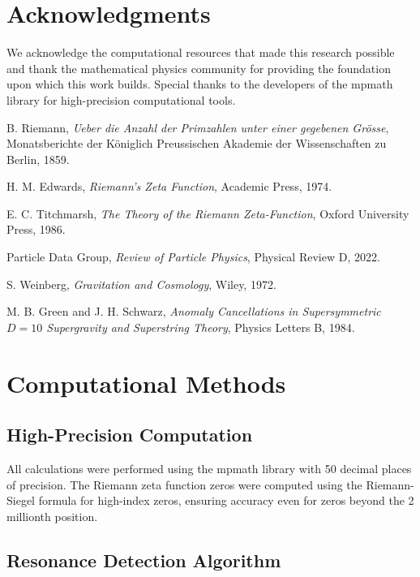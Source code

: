 \documentclass[12pt, a4paper]{article}
\begin{document}
\section{Acknowledgments}

We acknowledge the computational resources that made this research possible and thank the mathematical physics community for providing the foundation upon which this work builds. Special thanks to the developers of the mpmath library for high-precision computational tools.

\begin{thebibliography}{99}
B. Riemann, \emph{Ueber die Anzahl der Primzahlen unter einer gegebenen Gr{\"o}sse}, Monatsberichte der K{\"o}niglich Preussischen Akademie der Wissenschaften zu Berlin, 1859.

H. M. Edwards, \emph{Riemann's Zeta Function}, Academic Press, 1974.

E. C. Titchmarsh, \emph{The Theory of the Riemann Zeta-Function}, Oxford University Press, 1986.

Particle Data Group, \emph{Review of Particle Physics}, Physical Review D, 2022.

S. Weinberg, \emph{Gravitation and Cosmology}, Wiley, 1972.

M. B. Green and J. H. Schwarz, \emph{Anomaly Cancellations in Supersymmetric $D=10$ Supergravity and Superstring Theory}, Physics Letters B, 1984.
\end{thebibliography}

\appendix

\section{Computational Methods}

\subsection{High-Precision Computation}

All calculations were performed using the mpmath library with 50 decimal places of precision. The Riemann zeta function zeros were computed using the Riemann-Siegel formula for high-index zeros, ensuring accuracy even for zeros beyond the 2 millionth position.

\subsection{Resonance Detection Algorithm}
\end{document}

